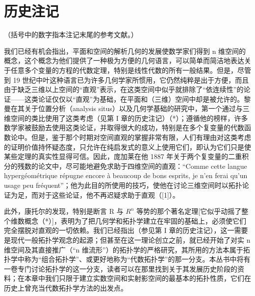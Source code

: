 \section*{历史注记}
{}

（括号中的数字指本注记末尾的参考文献。）

我们已经有机会指出，平面和空间的解析几何的发展使数学家们得到 n 维空间的概念，这个概念为他们提供了一种极为方便的几何语言，可以简单而简洁地表达关于任意多个变量的方程的代数定理，特别是线性代数的所有一般结果。但是，尽管到 19 世纪中叶这种语言已为许多几何学家所惯用，它仍然纯粹是出于方便，而且由于缺乏三维以上空间的“直观”表示，在这类空间中似乎就排除了“依连续性”的论证——这类论证仅仅以“直观”为基础，在平面和（三维）空间中却是被允许的。黎曼在其关于位置分析（analysis situs）以及几何学基础的研究中，第一个通过与三维空间的类比使用了这类考虑（见第 I 章的历史注记）（*）；遵循他的榜样，许多数学家被鼓励去使用这类论证，并取得很大的成功，特别是在多个复变量的代数函数论中。但是，鉴于那个时期对空间直观的掌握非常有限，人们有理由对这类考虑的证明价值持怀疑态度，只允许在纯启发式的意义上使用它们，即认为它们只是使某些定理的真实性显得可信。因此，庞加莱在他 1887 年关于两个复变量的二重积分的残数的论文中，尽可能地避免求助于四维空间的直观：“Comme cette langue hypergéométrique répugne encore à beaucoup de bons esprits, je n'en ferai qu'un usage peu fréquent”；他为此目的所使用的技巧，使他在讨论三维空间时以拓扑论证为足，而对于这些论证，他不再迟疑求助于直观（{[}1{]}）。

此外，康托尔的发现，特别是断言 R 与 \(R^{n}\) 等势的那个著名定理{[}它似乎动摇了整个维数概念（*）{]}，表明为了把几何学和拓扑学建立在牢固的基础上，必须使它们完全摆脱对直观的一切依赖。我们已经指出（参见第 I 章的历史注记），这一需要是现代一般拓扑学观念的起源；但甚至在这一理论创立之前，就已经开始了对实 n 维空间及其直接推广（“n 维流形”）的拓扑学的严格研究，其所用的方法本属于拓扑学中称为“组合拓扑学”、或更好地称为“代数拓扑学”的那一分支。本丛书中将有一卷专门讨论拓扑学的这一分支，读者可以在那里找到关于其发展历史阶段的资料；在本章中我们只限于建立实数空间和实射影空间的最基本的拓扑性质，它们在历史上曾充当代数拓扑学方法的出发点。

